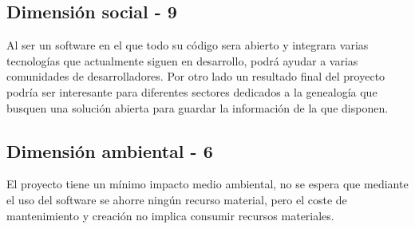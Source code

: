 \documentclass[12pt]{article} %
\begin{document}
\subsection{Dimensión social - 9}
Al ser un software en el que todo su código sera abierto y integrara varias tecnologías que actualmente siguen en desarrollo, podrá ayudar a varias comunidades de desarrolladores. Por otro lado un resultado final del proyecto podría ser interesante para diferentes sectores dedicados a la genealogía que busquen una solución abierta para guardar la información de la que disponen.
\subsection{Dimensión ambiental - 6}
El proyecto tiene un mínimo impacto medio ambiental, no se espera que mediante el uso del software se ahorre ningún recurso material, pero el coste de mantenimiento y creación no implica consumir recursos materiales.
\end{document}

